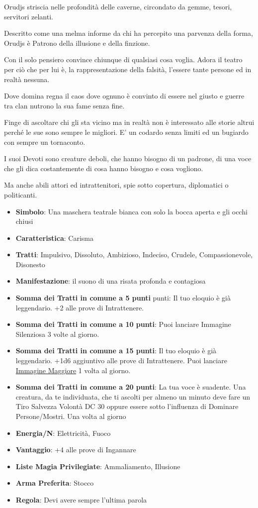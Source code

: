 \begin{multicols}{2}
Orudjs striscia nelle profondità delle caverne, circondato da gemme, tesori, servitori zelanti.

Descritto come una melma informe da chi ha percepito una parvenza della forma, Orudjs è Patrono della illusione e della finzione.

Con il solo pensiero convince chiunque di qualsiasi cosa voglia. Adora il teatro per ciò che per lui è, la rappresentazione della falsità, l'essere tante persone ed in realtà nessuna.

Dove domina regna il caos dove ognuno è convinto di essere nel giusto e guerre tra clan nutrono la sua fame senza fine.

Finge di ascoltare chi gli sta vicino ma in realtà non è interessato alle storie altrui perché le sue sono sempre le migliori. E' un codardo senza limiti ed un bugiardo con sempre un tornaconto.

I suoi Devoti sono creature deboli, che hanno bisogno di un padrone, di una voce che gli dica costantemente di cosa hanno bisogno e cosa vogliono.

Ma anche abili attori ed intrattenitori, spie sotto copertura, diplomatici o politicanti.

\begin{itemize}[leftmargin=*] \setlength{\itemsep}{0pt}
\item \textbf{Simbolo}: Una maschera teatrale bianca con solo la bocca aperta e gli occhi chiusi
\item \textbf{Caratteristica}: Carisma
\item \textbf{Tratti}: Impulsivo, Dissoluto, Ambizioso, Indeciso, Crudele, Compassionevole, Disonesto
\item \textbf{Manifestazione}: il suono di una risata profonda e contagiosa
\item \textbf{Somma dei Tratti in comune a 5 punti} punti: Il tuo eloquio è già leggendario. +2 alle prove di Intrattenere.
\item \textbf{Somma dei Tratti in comune a 10 punti}: Puoi lanciare Immagine Silenziosa 3 volte al giorno.
\item \textbf{Somma dei Tratti in comune a 15 punti}: Il tuo eloquio è già leggendario. +1d6 aggiuntivo alle prove di Intrattenere. Puoi lanciare \hyperlink{Immagine Maggiore}{Immagine Maggiore} 1 volta al giorno.
\item \textbf{Somma dei Tratti in comune a 20 punti}: La tua voce è suadente. Una creatura, da te individuata, che ti ascolti per almeno un minuto deve fare un Tiro Salvezza Volontà DC 30 oppure essere sotto l'influenza di Dominare Persone/Mostri. Una volta al giorno
\item \textbf{Energia/N}: Elettricità, Fuoco
\item \textbf{Vantaggio}: +4 alle prove di Ingannare
\item \textbf{Liste Magia Privilegiate}: Ammaliamento, Illusione
\item \textbf{Arma Preferita}: Stocco
\item \textbf{Regola}: Devi avere sempre l'ultima parola
\end{itemize}


\end{multicols}
